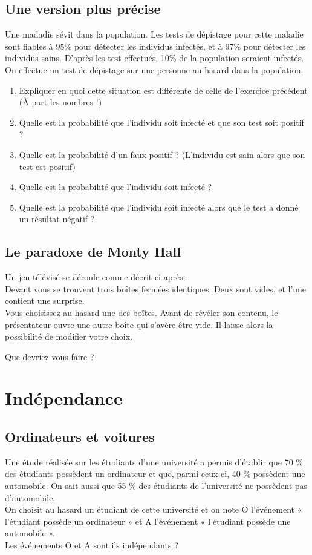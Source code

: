 \documentclass[oneside,12pt]{book}          %
\begin{document}
\subsection{Une version plus précise}
 Une madadie sévit dans la population. Les tests de dépistage pour cette maladie sont fiables à 95$\%$ pour détecter les individus infectés, et à 97$\%$ pour détecter les individus sains. D'après les test effectués, 10$\%$ de la population seraient infectés. \\
On effectue un test de dépistage sur une personne au hasard dans la population.
\begin{enumerate}
    \item Expliquer en quoi cette situation est différente de celle de l'exercice précédent (À part les nombres !)
    \item Quelle est la probabilité que l'individu soit infecté et que son test soit positif ?
    \item Quelle est la probabilité d'un faux positif ? (L'individu est sain alors que son test est positif)
    \item Quelle est la probabilité que l'individu soit infecté ?
    \item Quelle est la probabilité que l'individu soit infecté alors que le test a donné un résultat négatif ?
\end{enumerate}



\subsection{Le paradoxe de Monty Hall}
Un jeu télévisé se déroule comme décrit ci-après :\\
Devant vous se trouvent trois boîtes fermées identiques. Deux sont vides, et l'une contient une surprise.\\
Vous choisissez au hasard une des boîtes. Avant de révéler son contenu, le présentateur ouvre une autre boîte qui s'avère être vide. Il laisse alors la possibilité de modifier votre choix.

Que devriez-vous faire ?



\section{Indépendance}

\subsection{Ordinateurs et voitures}
 Une étude réalisée sur les étudiants d’une université a permis d’établir que 70 $\%$ des étudiants possèdent un ordinateur et que, parmi ceux-ci, 40 $\%$ possèdent une automobile. On sait aussi que 55 $\%$ des étudiants de l’université ne possèdent pas d’automobile. \\
On choisit au hasard un étudiant de cette université et on note O l’événement « l’étudiant possède un ordinateur » et A l’événement « l’étudiant possède une automobile ». \\
Les événements O et A sont ils indépendants ?
\end{document}
